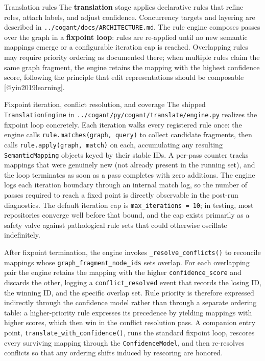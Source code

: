 \documentclass[
  ignorenonframetext,
]{beamer}
\begin{document}
\begin{frame}[fragile]{Translation rules}
\protect{}\label{translation-rules}
The \textbf{translation} stage applies declarative rules that refine
roles, attach labels, and adjust confidence. Concurrency targets and
layering are described in \texttt{../cogant/docs/ARCHITECTURE.md}. The
rule engine composes passes over the graph in a \textbf{fixpoint loop}:
rules are re-applied until no new semantic mappings emerge or a
configurable iteration cap is reached. Overlapping rules may require
priority ordering as documented there; when multiple rules claim the
same graph fragment, the engine retains the mapping with the highest
confidence score, following the principle that edit representations
should be composable {[}@yin2019learning{]}.

\begin{block}{Fixpoint iteration, conflict resolution, and coverage}
\protect{}\label{fixpoint-iteration-conflict-resolution-and-coverage}
The shipped \texttt{TranslationEngine} in
\texttt{../cogant/py/cogant/translate/engine.py} realizes the fixpoint
loop concretely. Each iteration walks every registered rule once: the
engine calls \texttt{rule.matches(graph,\ query)} to collect candidate
fragments, then calls \texttt{rule.apply(graph,\ match)} on each,
accumulating any resulting \texttt{SemanticMapping} objects keyed by
their stable IDs. A per-pass counter tracks mappings that were genuinely
new (not already present in the running set), and the loop terminates as
soon as a pass completes with zero additions. The engine logs each
iteration boundary through an internal match log, so the number of
passes required to reach a fixed point is directly observable in the
post-run diagnostics. The default iteration cap is
\texttt{max\_iterations\ =\ 10}; in testing, most repositories converge
well before that bound, and the cap exists primarily as a safety valve
against pathological rule sets that could otherwise oscillate
indefinitely.

After fixpoint termination, the engine invokes
\texttt{\_resolve\_conflicts()} to reconcile mappings whose
\texttt{graph\_fragment\_node\_ids} sets overlap. For each overlapping
pair the engine retains the mapping with the higher
\texttt{confidence\_score} and discards the other, logging a
\texttt{conflict\_resolved} event that records the losing ID, the
winning ID, and the specific overlap set. Rule priority is therefore
expressed indirectly through the confidence model rather than through a
separate ordering table: a higher-priority rule expresses its precedence
by yielding mappings with higher scores, which then win in the conflict
resolution pass. A companion entry point,
\texttt{translate\_with\_confidence()}, runs the standard fixpoint loop,
rescores every surviving mapping through the \texttt{ConfidenceModel},
and then re-resolves conflicts so that any ordering shifts induced by
rescoring are honored.


\end{block}
\end{frame}
\end{document}
